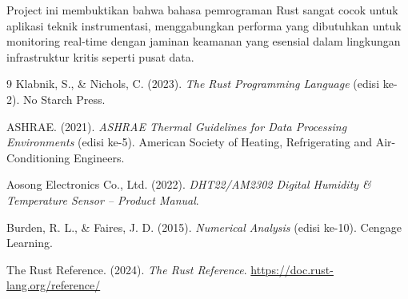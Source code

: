 \documentclass[journal]{IEEEtran}
\begin{document}
Project ini membuktikan bahwa bahasa pemrograman Rust sangat cocok untuk aplikasi teknik instrumentasi, menggabungkan performa yang dibutuhkan untuk monitoring real-time dengan jaminan keamanan yang esensial dalam lingkungan infrastruktur kritis seperti pusat data.

\begin{thebibliography}{9}
  Klabnik, S., \& Nichols, C. (2023). \textit{The Rust Programming Language} (edisi ke-2). No Starch Press.

  ASHRAE. (2021). \textit{ASHRAE Thermal Guidelines for Data Processing Environments} (edisi ke-5). American Society of Heating, Refrigerating and Air-Conditioning Engineers.

  Aosong Electronics Co., Ltd. (2022). \textit{DHT22/AM2302 Digital Humidity \& Temperature Sensor -- Product Manual}.

  Burden, R. L., \& Faires, J. D. (2015). \textit{Numerical Analysis} (edisi ke-10). Cengage Learning.

  The Rust Reference. (2024). \textit{The Rust Reference}. \url{https://doc.rust-lang.org/reference/}
\end{thebibliography}
\end{document}
